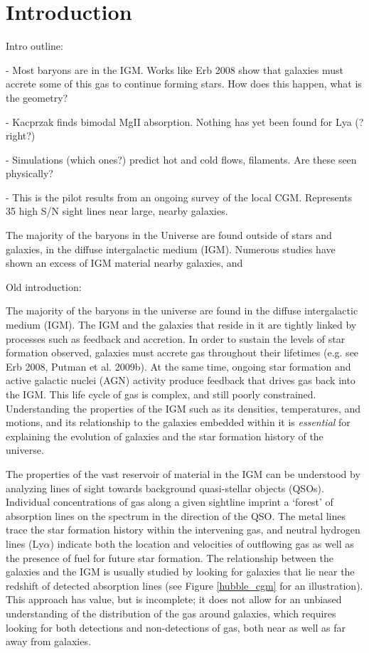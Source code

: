 \documentclass[iop]{emulateapj-rtx4}
\begin{document}
 
 
\section{Introduction}



Intro outline:

- Most baryons are in the IGM. Works like Erb 2008 show that galaxies must accrete some of this gas to continue forming stars. How does this happen, what is the geometry?

- Kacprzak finds bimodal MgII absorption. Nothing has yet been found for Lya (? right?)

- Simulations (which ones?) predict hot and cold flows, filaments. Are these seen physically?

- This is the pilot results from an ongoing survey of the local CGM. Represents 35 high S/N sight lines near large, nearby galaxies.





The majority of the baryons in the Universe are found outside of stars and galaxies, in the diffuse intergalactic medium (IGM). 
Numerous studies have shown an excess of IGM material nearby galaxies, and 


Old introduction:

\indent The majority of the baryons in the universe are found in the diffuse intergalactic medium (IGM). The IGM and the galaxies that reside in it are tightly linked by processes such as feedback and accretion. In order to sustain the levels of star formation observed, galaxies must accrete gas throughout their lifetimes (e.g. see Erb 2008, Putman et al. 2009b). At the same time, ongoing star formation and active galactic nuclei (AGN) activity produce feedback that drives gas back into the IGM. This life cycle of gas is complex, and still poorly constrained. Understanding the properties of the IGM such as its densities, temperatures, and motions, and its relationship to the galaxies embedded within it is \textit{essential} for explaining the evolution of galaxies and the star formation history of the universe. 

\indent The properties of the vast reservoir of material in the IGM can be understood by analyzing lines of sight towards background quasi-stellar objects (QSOs). Individual concentrations of gas along a given sightline imprint a `forest' of absorption lines on the spectrum in the direction of the QSO. The metal lines trace the star formation history within the intervening gas, and neutral hydrogen lines (Ly$\alpha$) indicate both the location and velocities of outflowing gas as well as the presence of fuel for future star formation. The relationship between the galaxies and the IGM is usually studied by looking for galaxies that lie near the redshift of detected absorption lines (see Figure \ref{hubble_cgm} for an illustration). This approach has value, but is incomplete; it does not allow for an unbiased understanding of the distribution of the gas around galaxies, which requires looking for both detections and non-detections of gas, both near as well as far away from galaxies.
\end{document}
